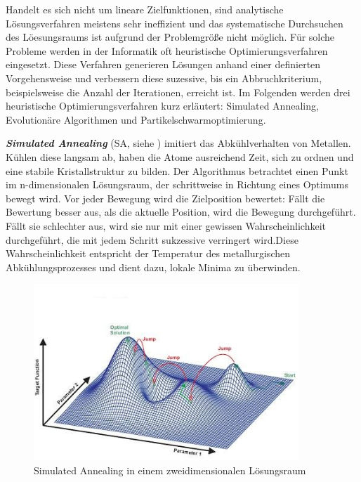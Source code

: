 Handelt es sich nicht um lineare Zielfunktionen, sind analytische L\"osungsverfahren meistens sehr ineffizient und das systematische Durchsuchen des L\"oesungsraums ist aufgrund der Problemgr\"o{\ss}e nicht m\"oglich. F\"ur solche Probleme werden in der Informatik oft heuristische Optimierungsverfahren eingesetzt. Diese Verfahren generieren L\"osungen anhand einer definierten Vorgehensweise und verbessern diese suzessive, bis ein Abbruchkriterium, beispielsweise die Anzahl der Iterationen, erreicht ist. Im Folgenden werden drei heuristische Optimierungsverfahren kurz erl\"autert: Simulated Annealing, Evolution\"are Algorithmen und Partikelschwarmoptimierung. 

\textbf{\textit{Simulated Annealing}} (SA, siehe \cite{Kirkpatrik}) imitiert das Abkühlverhalten von Metallen. Kühlen diese langsam ab, haben die Atome ausreichend Zeit, sich zu ordnen und eine stabile Kristallstruktur zu bilden. Der Algorithmus betrachtet einen Punkt im n-dimensionalen L\"osungsraum, der schrittweise in Richtung eines Optimums bewegt wird. Vor jeder Bewegung wird die Zielposition bewertet: Fällt die Bewertung besser aus, als die aktuelle Position, wird die Bewegung durchgeführt. Fällt sie schlechter aus, wird sie nur mit einer gewissen Wahrscheinlichkeit durchgef\"uhrt, die mit jedem Schritt sukzessive verringert wird.Diese Wahrscheinlichkeit entspricht der Temperatur des metallurgischen Abkühlungsprozesses und dient dazu, lokale Minima zu \"uberwinden.

\begin{figure}[ht]
\centering
\includegraphics[width=10cm]{graphics/SimAnn.jpg}
\caption{Simulated Annealing in einem zweidimensionalen L\"osungsraum}
\label{fig6}
\end{figure}

